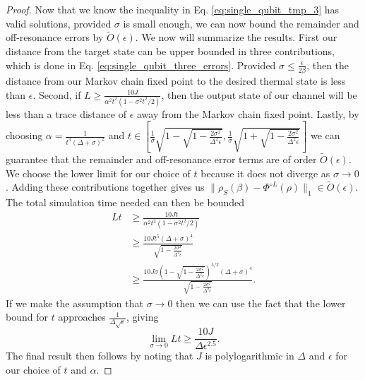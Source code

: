 \documentclass{article}
\newcommand{\matt}[1]{\todo[color=red!50, prepend, caption={Matt}, tickmarkheight=0.25cm]{#1}}
\newcommand{\norm}[1]{\| #1 \|}
\newcommand{\bigo}[1]{O\left(#1\right)}
\newcommand{\bigotilde}[1]{\widetilde{O} \left( #1 \right)}
\begin{document}
\begin{proof}
Now that we know the inequality in Eq. \eqref{eq:single_qubit_tmp_3} has valid solutions, provided $\sigma$ is small enough, we can now bound the remainder and off-resonance errors by $\bigotilde{\epsilon}$. 
We now will summarize the results. First our distance from the target state can be upper bounded in three contributions, which is done in Eq. \eqref{eq:single_qubit_three_errors}.
Provided $\sigma \le \frac{\epsilon}{2 \beta}$, then the distance from our Markov chain fixed point to the desired thermal state is less than $\epsilon$. Second, if $L \ge \frac{10 J}{\alpha^2 t^2(1 - \sigma^2 t^2 /2) }$, then the output state of our channel will be less than a trace distance of $\epsilon$ away from the Markov chain fixed point. Lastly, by choosing $\alpha  = \frac{1}{t^3(\Delta + \sigma)^2}$ and $t \in \left[ \frac{1}{\sigma}\sqrt{1 - \sqrt{1 - \frac{2 \sigma^2}{\Delta^2 \epsilon}} }, \frac{1}{\sigma}\sqrt{1 + \sqrt{1 - \frac{2 \sigma^2}{\Delta^2 \epsilon}} } \right]$ we can guarantee that the remainder and off-resonance error terms are of order $\bigotilde{\epsilon}$.  We choose the lower limit for our choice of $t$ because it does not diverge as $\sigma\rightarrow 0$.  Adding these contributions together gives us $\norm{\rho_S(\beta) - \Phi^{\circ L }(\rho)}_1 \in \bigotilde{\epsilon}$. The total simulation time needed can then be bounded
\begin{align}
    Lt &\ge \frac{10 J t}{\alpha^2 t^2 (1 - \sigma^2 t^2 / 2)} \\
    &\ge \frac{10 J t^5 (\Delta + \sigma)^4}{\sqrt{1 - \frac{2 \sigma^2}{\Delta^2 \epsilon}}} \\
    &\ge \frac{10 J \sigma \left( 1 - \sqrt{1 - \frac{2 \sigma^2}{\Delta^2 \epsilon}}\right)^{5/2} (\Delta + \sigma)^4}{\sqrt{1 - \frac{2 \sigma^2}{\Delta^2 \epsilon}}}.
\end{align}
If we make the assumption that $\sigma \to 0$ then we can use the fact that the lower bound for $t$ approaches $\frac{1}{\Delta \sqrt{\epsilon}}$, giving
\begin{equation}
    \lim_{\sigma \to 0} Lt \ge \frac{10 J}{\Delta \epsilon^{2.5}}.
\end{equation}
The final result then follows by noting that $J$ is polylogarithmic in $\Delta$ and $\epsilon$ for our choice of $t$ and $\alpha$.
 \end{proof}
\end{document}
